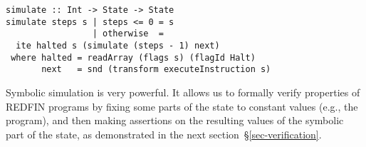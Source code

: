 \begin{verbatim}
simulate :: Int -> State -> State
simulate steps s | steps <= 0 = s
                 | otherwise  =
  ite halted s (simulate (steps - 1) next)
 where halted = readArray (flags s) (flagId Halt)
       next   = snd (transform executeInstruction s)
\end{verbatim}

\noindent
Symbolic simulation is very powerful. It allows us to formally verify properties
of REDFIN programs by fixing some parts of the state to constant values (e.g.,
the program), and then making assertions on the resulting values of
the symbolic part of the state, as demonstrated in the next
section~\S\ref{sec-verification}.
